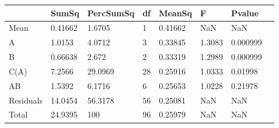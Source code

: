 \begin{table} 
\begin{tabular}{llllllll}
 & SumSq & PercSumSq & df & MeanSq & F & Pvalue \\ 
 \hline 
Mean & 0.41662 & 1.6705 & 1 & 0.41662 & NaN & NaN \\ 
A & 1.0153 & 4.0712 & 3 & 0.33845 & 1.3083 & 0.000999 \\ 
B & 0.66638 & 2.672 & 2 & 0.33319 & 1.2989 & 0.000999 \\ 
C(A) & 7.2566 & 29.0969 & 28 & 0.25916 & 1.0333 & 0.01998 \\ 
AB & 1.5392 & 6.1716 & 6 & 0.25653 & 1.0228 & 0.21978 \\ 
Residuals & 14.0454 & 56.3178 & 56 & 0.25081 & NaN & NaN \\ 
Total & 24.9395 & 100 & 96 & 0.25979 & NaN & NaN \\ 
\end{tabular} 
\end{table} 
